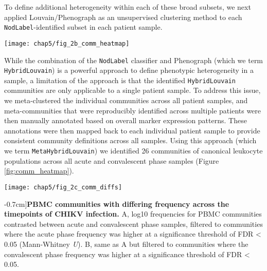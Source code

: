 To define additional heterogeneity within each of these broad subsets, we next applied Louvain/Phenograph\autocite{Levine2015a} as an unsupervised clustering method to each \texttt{NodLabel}-identified subset in each patient sample.
\begin{figure*}[htb]
  \texttt{[image: chap5/fig\_2b\_comm\_heatmap]}
  \caption[CyTOF signatures for acute CHIKV infection based on canonical immune cell phenotypes]{\textbf{CyTOF reveals signatures for acute CHIKV infection based on canonical immune cell phenotype clustering.} Heatmap of log scaled peripheral blood mononuclear cell (PBMC) community frequencies for all samples. Clinical variables are depicted for all samples across the top of the heatmap; 15d post symptom onset immunoglobulin G (IgG) titer and viral titer (which was measured during the acute phase) are both in units of log dilutions. Hierarchical clustering (using complete linkage) was applied to both samples (X axis) and communities (Y axis). Four major clusters of communities and two major clusters of samples (largely separating acute and convalescent samples) are highlighted. 
  }
  \label{fig:comm_heatmap}
\end{figure*}
While the combination of the \texttt{NodLabel} classifier and Phenograph (which we term \texttt{HybridLouvain}) is a powerful approach to define phenotypic heterogeneity in a sample, a limitation of the approach is that the identified \texttt{HybridLouvain} communities are only applicable to a single patient sample. To address this issue, we meta-clustered the individual communities across all patient samples, and meta-communities that were reproducibly identified across multiple patients were then manually annotated based on overall marker expression patterns. These annotations were then mapped back to each individual patient sample to provide consistent community definitions across all samples. Using this approach (which we term \texttt{MetaHybridLouvain}) we identified 26 communities of canonical leukocyte populations across all acute and convalescent phase samples (Figure \ref{fig:comm_heatmap}).
\begin{figure*}[htb]
  \texttt{[image: chap5/fig\_2c\_comm\_diffs]}
  \caption[PBMC communities with differing frequency across the CHIKV infection phases][-0.7cm]{\textbf{PBMC communities with differing frequency across the timepoints of CHIKV infection.} A, log10 frequencies for PBMC communities contrasted between acute and convalescent phase samples, filtered to communities where the acute phase frequency was higher at a significance threshold of FDR < 0.05 (Mann-Whitney \emph{U}). B, same as A but filtered to communities where the convalescent phase frequency was higher at a significance threshold of FDR < 0.05.
  }
  \label{fig:comm_diffs}
\end{figure*}
